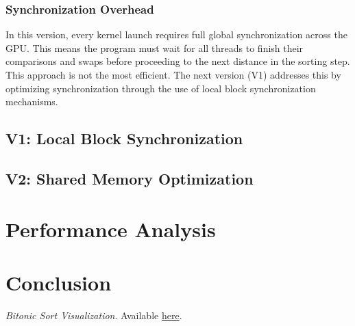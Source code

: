 \documentclass[a4paper,12pt]{article}
\begin{document}
\subsubsection*{Synchronization Overhead}

In this version, every kernel launch requires full global synchronization across the GPU. This means the program must wait for all threads to finish their comparisons and swaps before proceeding to the next distance in the sorting step. This approach is not the most efficient. The next version (V1) addresses this by optimizing synchronization through the use of local block synchronization mechanisms.

\subsection{V1: Local Block Synchronization}



\subsection{V2: Shared Memory Optimization}




\section{Performance Analysis}

\section{Conclusion}

\newpage
\begin{thebibliography}{9}

 \textit{Bitonic Sort Visualization}. Available \href{https://www.sortvisualizer.com/bitonicsort/}{here}.
\end{thebibliography}
\end{document}
